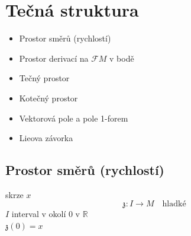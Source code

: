 \providecommand{\gmItrikr}{\mathfrak{z}}
\providecommand{\gmItriskrt}[1]{\tikz[baseline=(X.base)]{\node[inner sep=0pt](X){$#1$};\draw[gray](X.south west)--(X.north east);}}
\providecommand{\gmItriskrtb}[1]{\tikz[baseline=(X.base)]{\node[inner sep=0pt](X){$#1$};\draw[gray](X.north west)--(X.south east);}}

\section{Tečná struktura}

\begin{itemize}[nosep]
  \item Prostor směrů (rychlostí)
  \item Prostor derivací na $\mathcal{F}M$ v bodě
  \item Tečný prostor
  \item Kotečný prostor
  \item Vektorová pole a pole 1-forem
  \item Lieova závorka
\end{itemize}

\newpage
{}
\subsection{Prostor směrů (rychlostí)}

\begin{minipage}{0.62\textwidth}
 skrze $x$
\[
  \gmItrikr: I\to M \quad\text{hladké}
\]
\quad $I$ interval v okolí $0$ v $\mathbb{R}$ \\
\quad $\gmItrikr(0) = x$
\end{minipage}
\begin{minipage}{0.36\textwidth}
\end{minipage}

